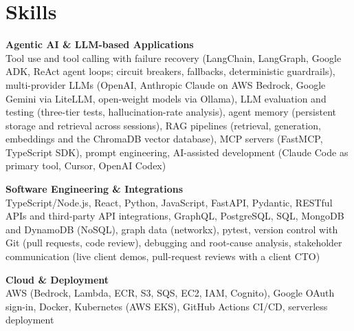 \documentclass[a4paper,11pt]{article}
\newcommand{\skillgroup}[2]{{\color{headernavy}\textbf{#1}}\\ #2\par\vspace{3pt}}
\begin{document}
\section{Skills}
\skillgroup{Agentic AI \& LLM-based Applications}{Tool use and tool calling with failure recovery (LangChain, LangGraph, Google ADK, ReAct agent loops; circuit breakers, fallbacks, deterministic guardrails), multi-provider LLMs (OpenAI, Anthropic Claude on AWS Bedrock, Google Gemini via LiteLLM, open-weight models via Ollama), LLM evaluation and testing (three-tier tests, hallucination-rate analysis), agent memory (persistent storage and retrieval across sessions), RAG pipelines (retrieval, generation, embeddings and the ChromaDB vector database), MCP servers (FastMCP, TypeScript SDK), prompt engineering, AI-assisted development (Claude Code as primary tool, Cursor, OpenAI Codex)}
\skillgroup{Software Engineering \& Integrations}{TypeScript/Node.js, React, Python, JavaScript, FastAPI, Pydantic, RESTful APIs and third-party API integrations, GraphQL, PostgreSQL, SQL, MongoDB and DynamoDB (NoSQL), graph data (networkx), pytest, version control with Git (pull requests, code review), debugging and root-cause analysis, stakeholder communication (live client demos, pull-request reviews with a client CTO)}
\skillgroup{Cloud \& Deployment}{AWS (Bedrock, Lambda, ECR, S3, SQS, EC2, IAM, Cognito), Google OAuth sign-in, Docker, Kubernetes (AWS EKS), GitHub Actions CI/CD, serverless deployment}
\end{document}
